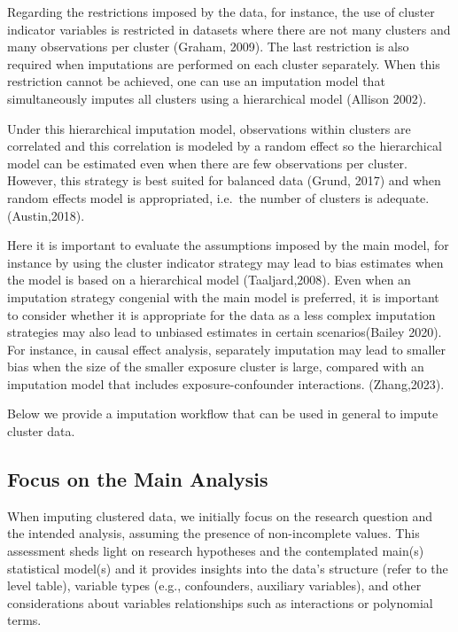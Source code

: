 \documentclass[
  article]{jss}
\begin{document}
Regarding the restrictions imposed by the data, for instance, the use of
cluster indicator variables is restricted in datasets where there are
not many clusters and many observations per cluster (Graham, 2009). The
last restriction is also required when imputations are performed on each
cluster separately. When this restriction cannot be achieved, one can
use an imputation model that simultaneously imputes all clusters using a
hierarchical model (Allison 2002).

Under this hierarchical imputation model, observations within clusters
are correlated and this correlation is modeled by a random effect so the
hierarchical model can be estimated even when there are few observations
per cluster. However, this strategy is best suited for balanced data
(Grund, 2017) and when random effects model is appropriated, i.e.~the
number of clusters is adequate. (Austin,2018).

Here it is important to evaluate the assumptions imposed by the main
model, for instance by using the cluster indicator strategy may lead to
bias estimates when the model is based on a hierarchical model
(Taaljard,2008). Even when an imputation strategy congenial with the
main model is preferred, it is important to consider whether it is
appropriate for the data as a less complex imputation strategies may
also lead to unbiased estimates in certain scenarios(Bailey 2020). For
instance, in causal effect analysis, separately imputation may lead to
smaller bias when the size of the smaller exposure cluster is large,
compared with an imputation model that includes exposure-confounder
interactions. (Zhang,2023).

Below we provide a imputation workflow that can be used in general to
impute cluster data.

\hypertarget{focus-on-the-main-analysis}{%
\subsection{Focus on the Main
Analysis}\label{focus-on-the-main-analysis}}

When imputing clustered data, we initially focus on the research
question and the intended analysis, assuming the presence of
non-incomplete values. This assessment sheds light on research
hypotheses and the contemplated main(s) statistical model(s) and it
provides insights into the data's structure (refer to the level table),
variable types (e.g., confounders, auxiliary variables), and other
considerations about variables relationships such as interactions or
polynomial terms.
\end{document}
